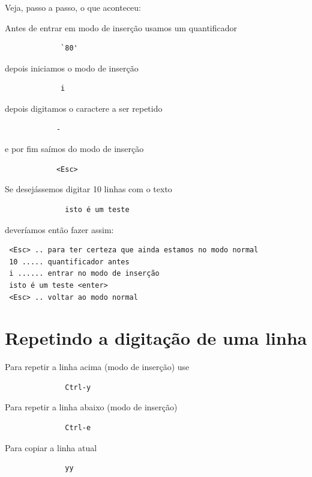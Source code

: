 \documentclass[10pt,a4paper,openany]{book}
\begin{document}
Veja, passo a passo, o que aconteceu:

 Antes de entrar em modo de inserção usamos um quantificador

\begin{verbatim}
			 `80'
\end{verbatim}

 depois iniciamos o modo de inserção

\begin{verbatim}
			 i
\end{verbatim}

depois digitamos o caractere a ser repetido

\begin{verbatim}
			-
\end{verbatim}

e por fim saímos do modo de inserção

\begin{verbatim}
			<Esc>
\end{verbatim}

Se desejássemos digitar 10 linhas com o texto

\begin{verbatim}
			  isto é um teste
\end{verbatim}

deveríamos então fazer assim:
	
\begin{verbatim}
 <Esc> .. para ter certeza que ainda estamos no modo normal
 10 ..... quantificador antes
 i ...... entrar no modo de inserção
 isto é um teste <enter>
 <Esc> .. voltar ao modo normal
\end{verbatim}

\section{Repetindo a digitação de uma linha }
Para repetir a linha acima (modo de inserção) use

\begin{verbatim}
			  Ctrl-y
\end{verbatim}

Para repetir a linha abaixo (modo de inserção)

\begin{verbatim}
			  Ctrl-e
\end{verbatim}

Para copiar a linha atual

\begin{verbatim}
			  yy
\end{verbatim}
\end{document}
